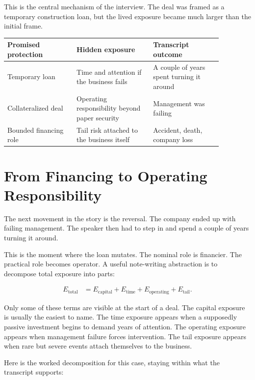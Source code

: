 This is the central mechanism of the interview. The deal was framed as a temporary construction loan, but the lived exposure became much larger than the initial frame.

\begin{table}
\centering
\begin{tabular}{p{0.28\linewidth} p{0.31\linewidth} p{0.28\linewidth}}
\hline
Promised protection & Hidden exposure & Transcript outcome \\
\hline
Temporary loan & Time and attention if the business fails & A couple of years spent turning it around \\
Collateralized deal & Operating responsibility beyond paper security & Management was failing \\
Bounded financing role & Tail risk attached to the business itself & Accident, death, company loss \\
\hline
\end{tabular}
\end{table}

\section{From Financing to Operating Responsibility}

The next movement in the story is the reversal. The company ended up with failing management. The speaker then had to step in and spend a couple of years turning it around.

This is the moment where the loan mutates. The nominal role is financier. The practical role becomes operator. A useful note-writing abstraction is to decompose total exposure into parts:

\begin{align}
E_{\text{total}}
&=
E_{\text{capital}}
+
E_{\text{time}}
+
E_{\text{operating}}
+
E_{\text{tail}}.
\end{align}

Only some of these terms are visible at the start of a deal. The capital exposure is usually the easiest to name. The time exposure appears when a supposedly passive investment begins to demand years of attention. The operating exposure appears when management failure forces intervention. The tail exposure appears when rare but severe events attach themselves to the business.

Here is the worked decomposition for this case, staying within what the transcript supports:

